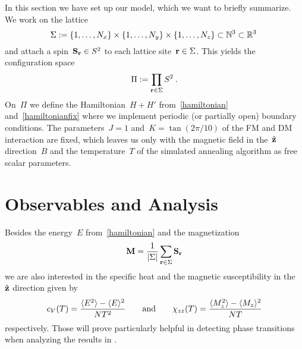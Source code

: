 In this section we have set up our model, which we want to briefly summarize. We
work on the lattice
%
\begin{equation}
  \Sigma := \{1,\dots,N_x\} \times \{1,\dots,N_y\} \times
  \{1,\dots,N_z\} \subset \mathbb{N}^3 \subset \mathbb{R}^3\:
\end{equation}
%
and attach a spin~$\mathbf{S}_{\mathbf{r}} \in S^2$ to each lattice site~$\mathbf{r} \in \Sigma$. This
yields the configuration space
%
\begin{equation}
  \Pi := \prod_{\mathbf{r} \in \Sigma} S^2\:.
\end{equation}
%
On~$\Pi$ we define the Hamiltonian~$H+H'$ from~\eqref{hamiltonian}
and~\eqref{hamiltonianfix} where we implement periodic (or partially open)
boundary conditions. The parameters~$J=1$ and~$K=\tan(2\pi / 10)$ of the FM and
DM interaction are fixed, which leaves us only with the magnetic field in
the~$\hat{\mathbf{z}}$ direction~$B$ and the temperature~$T$ of the simulated annealing
algorithm as free scalar parameters.
%
\section{Observables and Analysis}\label{sec:analysis}
%
Besides the energy~$E$ from~\eqref{hamiltonian} and the magnetization
%
\begin{equation}
  \M = \frac{1}{\abs{\Sigma}} \sum_{\r \in \Sigma} \S_{\r}
\end{equation}
%
we are also interested in the specific heat and the magnetic susceptibility in
the~$\hat{\mathbf{z}}$ direction given by
%
\begin{equation}
  c_V (T) = \frac{\langle E^2 \rangle - \langle E \rangle^2}{N T^2} \qquad\text{and}\qquad
  \chi_{zz} (T) = \frac{\langle M_z^2 \rangle - \langle M_z \rangle^2}{N T}
\end{equation}
%
respectively. Those will prove particularly helpful in detecting phase
transitions when analyzing the results in .

